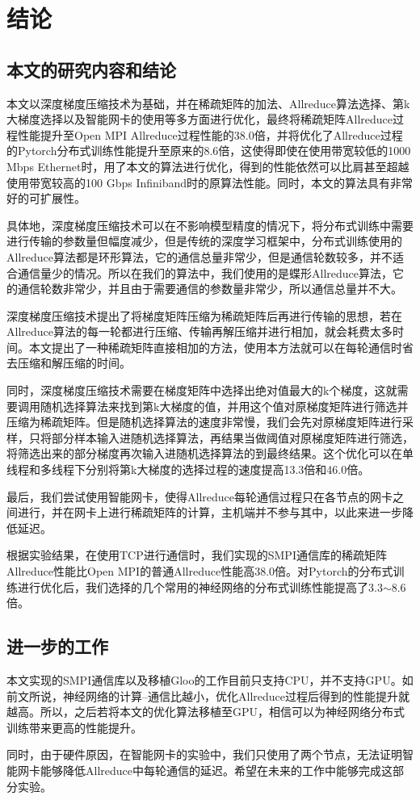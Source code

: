 \chapter{结论}
\label{chap5}

\section{本文的研究内容和结论}
本文以深度梯度压缩技术为基础，并在稀疏矩阵的加法、Allreduce算法选择、第k大梯度选择以及智能网卡的使用等多方面进行优化，最终将稀疏矩阵Allreduce过程性能提升至Open MPI Allreduce过程性能的38.0倍，并将优化了Allreduce过程的Pytorch分布式训练性能提升至原来的8.6倍，这使得即使在使用带宽较低的1000 Mbps Ethernet时，用了本文的算法进行优化，得到的性能依然可以比肩甚至超越使用带宽较高的100 Gbps Infiniband时的原算法性能。同时，本文的算法具有非常好的可扩展性。

具体地，深度梯度压缩技术可以在不影响模型精度的情况下，将分布式训练中需要进行传输的参数量但幅度减少，但是传统的深度学习框架中，分布式训练使用的Allreduce算法都是环形算法，它的通信总量非常少，但是通信轮数较多，并不适合通信量少的情况。所以在我们的算法中，我们使用的是蝶形Allreduce算法，它的通信轮数非常少，并且由于需要通信的参数量非常少，所以通信总量并不大。

深度梯度压缩技术提出了将梯度矩阵压缩为稀疏矩阵后再进行传输的思想，若在Allreduce算法的每一轮都进行压缩、传输再解压缩并进行相加，就会耗费太多时间。本文提出了一种稀疏矩阵直接相加的方法，使用本方法就可以在每轮通信时省去压缩和解压缩的时间。

同时，深度梯度压缩技术需要在梯度矩阵中选择出绝对值最大的k个梯度，这就需要调用随机选择算法来找到第k大梯度的值，并用这个值对原梯度矩阵进行筛选并压缩为稀疏矩阵。但是随机选择算法的速度非常慢，我们会先对原梯度矩阵进行采样，只将部分样本输入进随机选择算法，再结果当做阈值对原梯度矩阵进行筛选，将筛选出来的部分梯度再次输入进随机选择算法的到最终结果。这个优化可以在单线程和多线程下分别将第k大梯度的选择过程的速度提高13.3倍和46.0倍。

最后，我们尝试使用智能网卡，使得Allreduce每轮通信过程只在各节点的网卡之间进行，并在网卡上进行稀疏矩阵的计算，主机端并不参与其中，以此来进一步降低延迟。

根据实验结果，在使用TCP进行通信时，我们实现的SMPI通信库的稀疏矩阵Allreduce性能比Open MPI的普通Allreduce性能高38.0倍。对Pytorch的分布式训练进行优化后，我们选择的几个常用的神经网络的分布式训练性能提高了3.3$\sim$8.6倍。

\section{进一步的工作}
本文实现的SMPI通信库以及移植Gloo的工作目前只支持CPU，并不支持GPU。如前文所说，神经网络的计算--通信比越小，优化Allreduce过程后得到的性能提升就越高。所以，之后若将本文的优化算法移植至GPU，相信可以为神经网络分布式训练带来更高的性能提升。

同时，由于硬件原因，在智能网卡的实验中，我们只使用了两个节点，无法证明智能网卡能够降低Allreduce中每轮通信的延迟。希望在未来的工作中能够完成这部分实验。